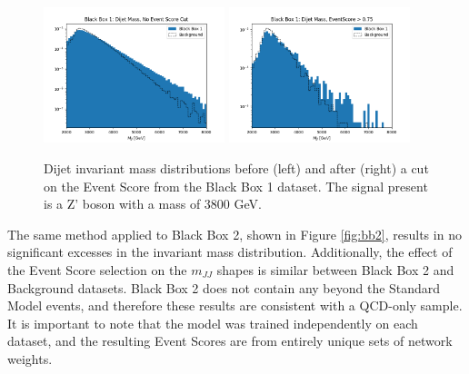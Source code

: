 \documentclass[letterpaper,11pt]{article}
\begin{document}
\begin{figure}[h!]
	\begin{center}
		\includegraphics[width=0.47\textwidth]{imgs/BB1.png}
		\includegraphics[width=0.47\textwidth]{imgs/BB1_Cut.png}
	\end{center}
	\caption{Dijet invariant mass distributions before (left) and after (right) a cut on the Event Score from the Black Box 1 dataset. The signal present is a Z' boson with a mass of 3800 GeV.}
	\label{fig:bb1}
\end{figure}

The same method applied to Black Box 2, shown in Figure \ref{fig:bb2}, results in no significant excesses in the invariant mass distribution. Additionally, the effect of the Event Score selection on the $m_{JJ}$ shapes is similar between Black Box 2 and Background datasets. Black Box 2 does not contain any beyond the Standard Model events, and therefore these results are consistent with a QCD-only sample. It is important to note that the model was trained independently on each dataset, and the resulting Event Scores are from entirely unique sets of network weights.
\end{document}
